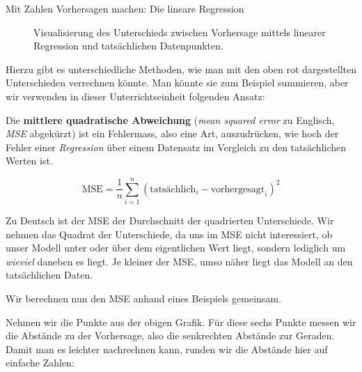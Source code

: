\begin{lpu}{Mit Zahlen Vorhersagen machen: Die lineare Regression}
\begin{figure}[h]
\caption{Visualisierung des Unterschieds zwischen Vorhersage mittels linearer Regression und tatsächlichen Datenpunkten.}
\label{fig:error}

\end{figure}


Hierzu gibt es unterschiedliche Methoden, wie man mit den oben \textcolor{red!70}{rot} dargestellten Unterschieden verrechnen könnte. Man könnte sie zum Beispiel summieren, aber wir verwenden in dieser Unterrichtseinheit folgenden Ansatz:

\begin{theorie}
    Die \textbf{mittlere quadratische Abweichung} (\textit{mean squared error} zu Englisch, \textit{MSE} abgekürzt) ist ein Fehlermass, also eine Art, auszudrücken, wie hoch der Fehler einer \textit{Regression} über einem Datensatz im Vergleich zu den tatsächlichen Werten ist.

     \[
  \text{MSE} = \frac{1}{n} \sum_{i=1}^{n} \left( \text{tatsächlich}_{i} - \text{vorhergesagt}_{i} \right)^2
  \]

  Zu Deutsch ist der MSE der Durchschnitt der quadrierten Unterschiede. Wir nehmen das Quadrat der Unterschiede, da uns im MSE nicht interessiert, ob unser Modell unter oder über dem eigentlichen Wert liegt, sondern lediglich um \textit{wieviel} daneben es liegt. Je kleiner der MSE, umso näher liegt das Modell an den tatsächlichen Daten.
\end{theorie}


Wir berechnen nun den MSE anhand eines Beispiels gemeinsam.

Nehmen wir die Punkte aus der obigen Grafik. Für diese sechs Punkte messen wir die Abstände zu der Vorhersage, also die senkrechten Abstände zur Geraden. Damit man es leichter nachrechnen kann, runden wir die Abstände hier auf einfache Zahlen:


\end{lpu}
